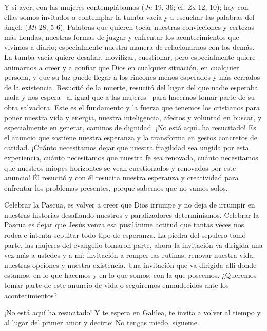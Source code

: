 \begin{body}
Y si ayer, con las mujeres contemplábamos  (\textit{Jn} 19, 36; cf. \textit{Za} 12, 10); hoy con ellas somos invitados a contemplar la tumba vacía y a escuchar las palabras del ángel:  (\textit{Mt} 28, 5-6). Palabras que quieren tocar nuestras convicciones y certezas más hondas, nuestras formas de juzgar y enfrentar los acontecimientos que vivimos a diario; especialmente nuestra manera de relacionarnos con los demás. La tumba vacía quiere desafiar, movilizar, cuestionar, pero especialmente quiere animarnos a creer y a confiar que Dios  en cualquier situación, en cualquier persona, y que su luz puede llegar a los rincones menos esperados y más cerrados de la existencia. Resucitó de la muerte, resucitó del lugar del que nadie esperaba nada y nos espera –al igual que a las mujeres– para hacernos tomar parte de su obra salvadora. Este es el fundamento y la fuerza que tenemos los cristianos para poner nuestra vida y energía, nuestra inteligencia, afectos y voluntad en buscar, y especialmente en generar, caminos de dignidad. ¡No está aquí\ldots ha resucitado! Es el anuncio que sostiene nuestra esperanza y la transforma en gestos concretos de caridad. ¡Cuánto necesitamos dejar que nuestra fragilidad sea ungida por esta experiencia, cuánto necesitamos que nuestra fe sea renovada, cuánto necesitamos que nuestros miopes horizontes se vean cuestionados y renovados por este anuncio! Él resucitó y con él resucita nuestra esperanza y creatividad para enfrentar los problemas presentes, porque sabemos que no vamos solos. 

Celebrar la Pascua, es volver a creer que Dios irrumpe y no deja de irrumpir en nuestras historias desafiando nuestros  y paralizadores determinismos. Celebrar la Pascua es dejar que Jesús venza esa pusilánime actitud que tantas veces nos rodea e intenta sepultar todo tipo de esperanza. La piedra del sepulcro tomó parte, las mujeres del evangelio tomaron parte, ahora la invitación va dirigida una vez más a ustedes y a mí: invitación a romper las rutinas, renovar nuestra vida, nuestras opciones y nuestra existencia. Una invitación que va dirigida allí donde estamos, en lo que hacemos y en lo que somos; con la  que poseemos. ¿Queremos tomar parte de este anuncio de vida o seguiremos enmudecidos ante los acontecimientos?

¡No está aquí ha resucitado! Y te espera en Galilea, te invita a volver al tiempo y al lugar del primer amor y decirte: No tengas miedo, sígueme.
\end{body}


